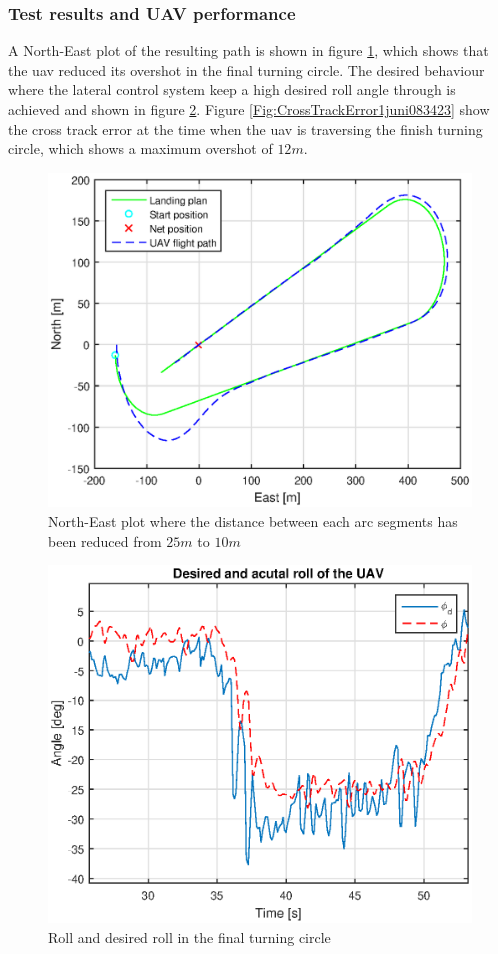 \subsubsection{Test results and UAV performance}
A North-East plot of the resulting path is shown in figure \ref{Fig:NorthEast1juni083423}, which shows that the \gls{uav} reduced its overshot in the final turning circle. The desired behaviour where the lateral control system keep a high desired roll angle through is achieved and shown in figure \ref{Fig:RollFinalTurning083423}. Figure \ref{Fig:CrossTrackError1juni083423} show the cross track error at the time when the \gls{uav} is traversing the finish turning circle, which shows a maximum overshot of $12 m$.
\begin{figure}[H]
\centering
\includegraphics[scale=0.7]{figs/Experiment/NorthEast1juni083423.eps}
\caption{North-East plot where the distance between each arc segments has been reduced from $25 m$ to $10 m$}
\label{Fig:NorthEast1juni083423}
\end{figure}
\begin{figure}
\centering
\includegraphics[scale=0.7]{figs/Experiment/Roll1juni083423.eps}
\caption{Roll and desired roll in the final turning circle}
\label{Fig:RollFinalTurning083423}
\end{figure}
